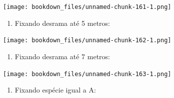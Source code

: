 \documentclass[
]{article}
\newenvironment{Shaded}{\begin{snugshade}}{\end{snugshade}}
\newcommand{\DataTypeTok}[1]{\textcolor[rgb]{0.13,0.29,0.53}{#1}}
\newcommand{\DecValTok}[1]{\textcolor[rgb]{0.00,0.00,0.81}{#1}}
\newcommand{\KeywordTok}[1]{\textcolor[rgb]{0.13,0.29,0.53}{\textbf{#1}}}
\newcommand{\NormalTok}[1]{#1}
\newcommand{\OperatorTok}[1]{\textcolor[rgb]{0.81,0.36,0.00}{\textbf{#1}}}
\newcommand{\StringTok}[1]{\textcolor[rgb]{0.31,0.60,0.02}{#1}}
\providecommand{\tightlist}{%
  \setlength{\itemsep}{0pt}\setlength{\parskip}{0pt}}
\begin{document}
\begin{Shaded}
\end{Shaded}

\texttt{[image: bookdown\_files/unnamed-chunk-161-1.png]}

\begin{enumerate}
\def\labelenumi{\arabic{enumi}.}
\setcounter{enumi}{4}
\tightlist
\item
  Fixando desrama até 5 metros:
\end{enumerate}

\begin{Shaded}
\end{Shaded}

\texttt{[image: bookdown\_files/unnamed-chunk-162-1.png]}

\begin{enumerate}
\def\labelenumi{\arabic{enumi}.}
\setcounter{enumi}{5}
\tightlist
\item
  Fixando desrama até 7 metros:
\end{enumerate}

\begin{Shaded}
\end{Shaded}

\texttt{[image: bookdown\_files/unnamed-chunk-163-1.png]}

\begin{enumerate}
\def\labelenumi{\arabic{enumi}.}
\setcounter{enumi}{6}
\tightlist
\item
  Fixando espécie igual a A:
\end{enumerate}
\end{document}
